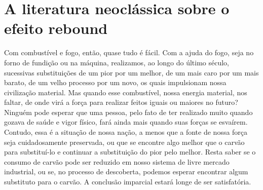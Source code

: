 
\setlength{\epigraphwidth}{0.9\textwidth}

\chapter{A literatura neoclássica sobre o efeito rebound}
\epigraph{Com combustível e fogo, então, quase tudo é fácil. Com a ajuda do fogo, seja no forno de fundição ou na máquina, realizamos, ao longo do último século, sucessivas substituições de um pior por um melhor, de um mais caro por um mais barato, de um velho processo por um novo, os quais impulsionam nossa civilização material. Mas quando esse combustível, nossa energia material, nos faltar, de onde virá a força para realizar feitos iguais ou maiores no futuro? Ninguém pode esperar que uma pessoa, pelo fato de ter realizado muito quando gozava de saúde e vigor físico, fará ainda mais quando suas forças se esvaírem. Contudo, essa é a situação de nossa nação, a menos que a fonte de nossa força seja cuidadosamente preservada, ou que se encontre algo melhor que o carvão para substituí-lo e continuar a substituição do pior pelo melhor. Resta saber se o consumo de carvão pode ser reduzido em nosso sistema de livre mercado industrial, ou se, no processo de descoberta, podemos esperar encontrar algum substituto para o carvão. A conclusão imparcial estará longe de ser satisfatória.}{\textcite[p. 72]{Jevons1866}}

